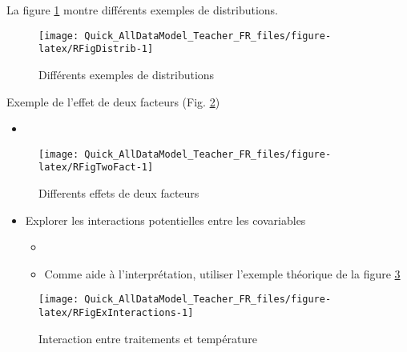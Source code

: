 \documentclass[french,a4paper]{article}
\providecommand{\tightlist}{%
  \setlength{\itemsep}{0pt}\setlength{\parskip}{0pt}}
\begin{document}
La figure \ref{fig:RFigDistrib} montre différents exemples de
distributions.



\begin{figure}[!h]

{\centering \texttt{[image: Quick\_AllDataModel\_Teacher\_FR\_files/figure-latex/RFigDistrib-1]} 

}

\caption{Différents exemples de distributions\\}\label{fig:RFigDistrib}
\end{figure}

Exemple de l'effet de deux facteurs (Fig. \ref{fig:RFigTwoFact})



\begin{itemize}
\item
\end{itemize}

\begin{figure}[!h]

{\centering \texttt{[image: Quick\_AllDataModel\_Teacher\_FR\_files/figure-latex/RFigTwoFact-1]} 

}

\caption{Differents effets de deux facteurs}\label{fig:RFigTwoFact}
\end{figure}

\begin{itemize}
\tightlist
\item
  Explorer les interactions potentielles entre les covariables

  \begin{itemize}
  \item
  \item
    Comme aide à l'interprétation, utiliser l'exemple théorique de la
    figure \ref{fig:RFigExInteractions}
  \end{itemize}
\end{itemize}



\begin{figure}[!h]

{\centering \texttt{[image: Quick\_AllDataModel\_Teacher\_FR\_files/figure-latex/RFigExInteractions-1]} 

}

\caption{Interaction entre traitements et température}\label{fig:RFigExInteractions}
\end{figure}
\end{document}
